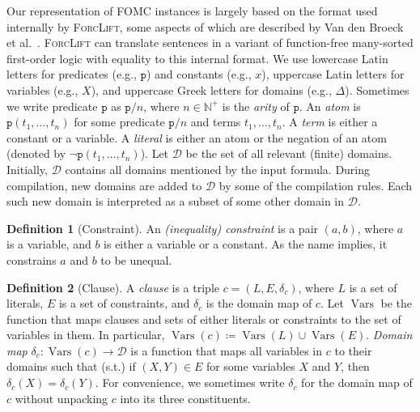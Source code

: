 \documentclass{article}
\theoremstyle{definition}
\newtheorem{definition}{Definition}
\theoremstyle{remark}
\DeclareMathOperator{\Vars}{Vars}
\begin{document}
Our representation of FOMC instances is largely based on the format used
internally by \textsc{ForcLift}, some aspects of which are described by Van den
Broeck et al.~. \textsc{ForcLift} can
translate sentences in a variant of function-free many-sorted first-order logic
with equality to this internal format. We use lowercase Latin letters for
predicates (e.g., $\texttt{p}$) and constants (e.g., $x$), uppercase Latin
letters for variables (e.g., $X$), and uppercase Greek letters for domains
(e.g., $\Delta$). Sometimes we write predicate $\texttt{p}$ as $\texttt{p}/n$,
where $n \in \mathbb{N}^{+}$ is the \emph{arity} of $\texttt{p}$. An \emph{atom}
is $\texttt{p}(t_1, \dots, t_n)$ for some predicate $\texttt{p}/n$ and terms
$t_{1}, \dots, t_{n}$. A \emph{term} is either a constant or a variable. A
\emph{literal} is either an atom or the negation of an atom (denoted by
$\neg \texttt{p}(t_1, \dots, t_n)$). Let $\mathcal{D}$ be the set of all
relevant (finite) domains. Initially, $\mathcal{D}$ contains all domains
mentioned by the input formula. During compilation, new domains are added to
$\mathcal{D}$ by some of the compilation rules. Each such new domain is
interpreted as a subset of some other domain in $\mathcal{D}$.

\begin{definition}[Constraint]\label{def:constraint}
  An \emph{(inequality) constraint} is a pair $(a, b)$, where $a$ is a variable,
  and $b$ is either a variable or a constant. As the name implies, it constrains
  $a$ and $b$ to be unequal.
\end{definition}

\begin{definition}[Clause]\label{def:clause}
  A \emph{clause}
  is a triple $c = (L, E, \delta_c)$, where $L$ is a set of literals, $E$ is a
  set of constraints, and $\delta_c$ is the domain map of $c$. Let $\Vars$ be
  the function that maps clauses and sets of either literals or constraints to
  the set of variables in them. In particular,
  $\Vars(c) \coloneqq \Vars(L) \cup \Vars(E)$. \emph{Domain map}
  $\delta_{c}\colon \Vars(c) \to \mathcal{D}$ is a function that maps all
  variables in $c$ to their domains such that (s.t.) if $(X, Y) \in E$ for some
  variables $X$ and $Y$, then $\delta_c(X) = \delta_c(Y)$. For convenience, we
  sometimes write $\delta_c$ for the domain map of $c$ without unpacking $c$
  into its three constituents.
\end{definition}

\end{document}
